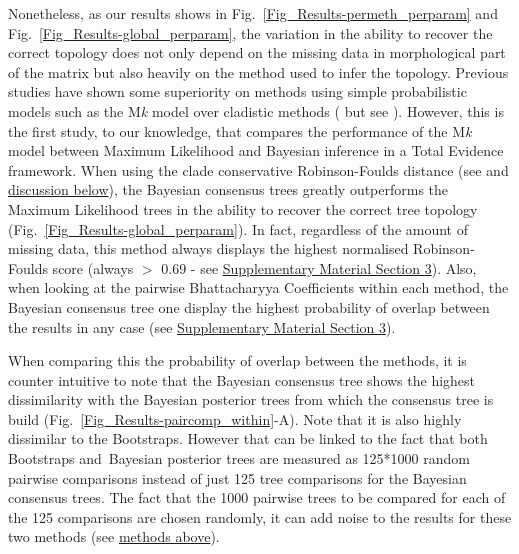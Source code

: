 \documentclass[12pt,letterpaper]{article}
\begin{document}
Nonetheless, as our results shows in Fig.~\ref{Fig_Results-permeth_perparam} and Fig.~\ref{Fig_Results-global_perparam}, the variation in the ability to recover the correct topology does not only depend on the missing data in morphological part of the matrix but also heavily on the method used to infer the topology. Previous studies have shown some superiority on methods using simple probabilistic models such as the M\textit{k} model \citep{lewisa2001} over cladistic methods (\citealt{wrightbayesian2014} but see \citealt{spencerefficacy2013}). However, this is the first study, to our knowledge, that compares the performance of the M\textit{k} model \citep{lewisa2001} between Maximum Likelihood and Bayesian inference in a Total Evidence framework. %
When using the clade conservative Robinson-Foulds distance (see \citealt{kuhnerpractical2014} and \hyperref[metrics_discussion]{discussion below}), the Bayesian consensus trees greatly outperforms the Maximum Likelihood trees in the ability to recover the correct tree topology (Fig.~\ref{Fig_Results-global_perparam}). In fact, regardless of the amount of missing data, this method always displays the highest normalised Robinson-Foulds score (always $>$ 0.69 - see \hyperref[SupplementaryMaterial]{Supplementary Material Section 3}). Also, when looking at the pairwise Bhattacharyya Coefficients within each method, the Bayesian consensus tree one display the highest probability of overlap between the results in any case (see \hyperref[SupplementaryMaterial]{Supplementary Material Section 3}).

When comparing this the probability of overlap between the methods, it is counter intuitive to note that the Bayesian consensus tree shows the highest dissimilarity with the Bayesian posterior trees from which the consensus tree is build (Fig.~\ref{Fig_Results-paircomp_within}-A). Note that it is also highly dissimilar to the Bootstraps. However that can be linked to the fact that both Bootstraps and Bayesian posterior trees are measured as 125*1000 random pairwise comparisons instead of just 125 tree comparisons for the Bayesian consensus trees. The fact that the 1000 pairwise trees to be compared for each of the 125 comparisons are chosen randomly, it can add noise to the results for these two methods (see \hyperref[tree_comparisons]{methods above}).
\end{document}
